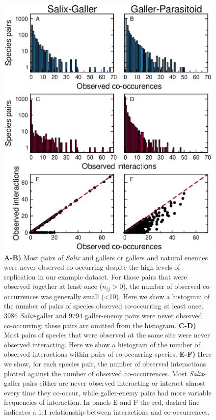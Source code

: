 \documentclass[12pt]{article}
\begin{document}
    \begin{figure}
      \caption{\textbf{A-B)} Most pairs of \emph{Salix} and gallers or gallers and natural enemies were never observed co-occurring despite the high levels of replication in our example dataset. For those pairs that were observed together at least once ($n_{ij}>0$), the number of observed co-occurrences was generally small (\textless10). Here we show a histogram of the number of pairs of species observed co-occurring at least once. 3986 \emph{Salix}-galler and 9794 galler-enemy pairs were never observed co-occurring: these pairs are omitted from the histogram. \textbf{C-D)} Most pairs of species that were observed at the same site were never observed interacting. Here we show a histogram of the number of observed interactions within pairs of co-occurring species. \textbf{E-F)} Here we show, for each species pair, the number of observed interactions plotted against the number of observed co-occurrences. Most \emph{Salix}-galler pairs either are never observed interacting or interact almost every time they co-occur, while galler-enemy pairs had more variable frequencies of interaction. In panels E and F the red, dashed line indicates a 1:1 relationship between interactions and co-occurrences.}
      \label{histograms}
      \includegraphics*[width=.8\textwidth]{figures/Salix_Galler_histogram.eps}
      \end{figure}
\end{document}
